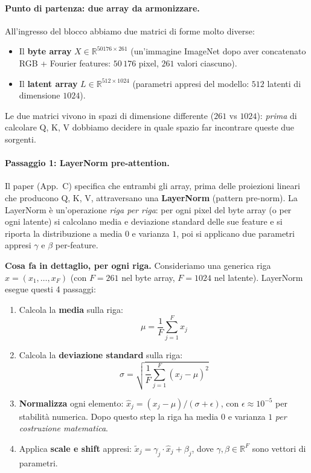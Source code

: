 \documentclass[
  11pt,
]{article}
\begin{document}
\paragraph{Punto di partenza: due array da armonizzare.} All'ingresso del blocco abbiamo due matrici di forme molto diverse:

\begin{itemize}\setlength\itemsep{0.2em}
\item Il \textbf{byte array} $X \in \mathbb{R}^{50176 \times 261}$ (un'immagine ImageNet dopo aver concatenato RGB + Fourier features: $50\,176$ pixel, $261$ valori ciascuno).
\item Il \textbf{latent array} $L \in \mathbb{R}^{512 \times 1024}$ (parametri appresi del modello: $512$ latenti di dimensione $1024$).
\end{itemize}

Le due matrici vivono in spazi di dimensione differente ($261$ vs $1024$): \emph{prima} di calcolare Q, K, V dobbiamo decidere in quale spazio far incontrare queste due sorgenti.

\paragraph{Passaggio 1: LayerNorm pre-attention.} Il paper (App.\ C) specifica che entrambi gli array, prima delle proiezioni lineari che producono Q, K, V, attraversano una \textbf{LayerNorm} (pattern pre-norm). La LayerNorm è un'operazione \emph{riga per riga}: per ogni pixel del byte array (o per ogni latente) si calcolano media e deviazione standard delle sue feature e si riporta la distribuzione a media $0$ e varianza $1$, poi si applicano due parametri appresi $\gamma$ e $\beta$ per-feature.

\medskip
\textbf{Cosa fa in dettaglio, per ogni riga.} Consideriamo una generica riga $x = (x_1, \ldots, x_F)$ (con $F = 261$ nel byte array, $F = 1024$ nel latente). LayerNorm esegue questi 4 passaggi:

\begin{enumerate}\setlength\itemsep{0.2em}
\item Calcola la \textbf{media} sulla riga:
\[
\mu = \frac{1}{F}\sum_{j=1}^{F} x_j
\]
\item Calcola la \textbf{deviazione standard} sulla riga:
\[
\sigma = \sqrt{\frac{1}{F}\sum_{j=1}^{F} (x_j - \mu)^2}
\]
\item \textbf{Normalizza} ogni elemento: $\hat{x}_j = (x_j - \mu)/(\sigma + \epsilon)$, con $\epsilon \approx 10^{-5}$ per stabilità numerica. Dopo questo step la riga ha media $0$ e varianza $1$ \emph{per costruzione matematica}.
\item Applica \textbf{scale e shift} appresi: $\tilde{x}_j = \gamma_j \cdot \hat{x}_j + \beta_j$, dove $\gamma, \beta \in \mathbb{R}^F$ sono vettori di parametri.
\end{enumerate}
\end{document}
